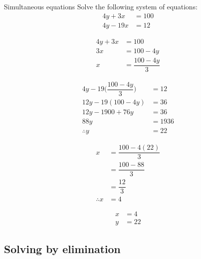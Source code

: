 \begin{wex}
{Simultaneous equations}
{
Solve the following system of equations:
\begin{align*}
  4y+3x &= 100 \\
  4y - 19x &= 12
\end{align*}
}
{
\begin{align*}
  4y+3x &= 100 \\
  3x &= 100 - 4y \\
  x &= \dfrac{100 - 4y}{3}
\end{align*}

\begin{align*}
  4y - 19\Big(\dfrac{100 - 4y}{3}\Big) &= 12 \\
  12y - 19(100 - 4y) &= 36 \\
  12y - 1900 + 76y &= 36 \\
  88y &= 1936 \\
  \therefore y &= 22
\end{align*}

\begin{align*}
  x &= \dfrac{100 - 4(22)}{3} \\
    &= \dfrac{100-88}{3} \\
    &= \dfrac{12}{3} \\
  \therefore x &= 4
\end{align*}


\begin{align*}
  x &= 4 \\
  y &= 22
\end{align*}
}
\end{wex}

\subsection*{Solving by elimination}

